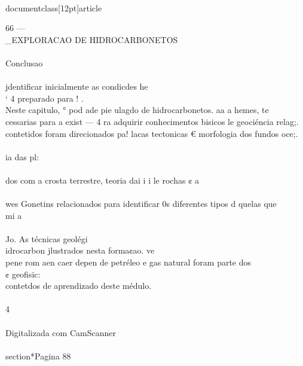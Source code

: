 \\documentclass[12pt]{article}
\begin{document}
{66 —\\_EXPLORACAO DE HIDROCARBONETOS\\
\\
Conclusao\\
\\
jdentificar inicialmente as condicdes he\\
‘ 4 preparado para ! .\\
Neste capitulo, ° pod ade pie ulagdo de hidrocarbonetos. aa a hemes, te\\
cessarias para a exist — 4 ra adquirir conhecimentos bisicos le geociéncia relag;.\\
contetidos foram direcionados pa! lacas tectonicas € morfologia dos fundos oce;.\\
\\
ia das pl:\\
\\
dos com a crosta terrestre, teoria dai i i le rochas ¢ a\\
\\
wes Gonetins relacionados para identificar 0s diferentes tipos d quelas que\\
mi a\\
\\
Jo. As técnicas geolégi\\
idrocarbon jlustrados nesta forma¢ao. ve\\
pene rom aen caer depen de petréleo e gas natural foram parte dos\\
¢ geofisic:\\
contetdos de aprendizado deste médulo.\\
\\
4\\
\\
Digitalizada com CamScanner\\

\\section*{Pagina 88}

}
\end{document}
